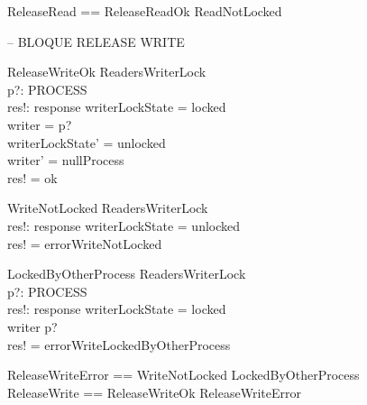 \documentclass{article}
\begin{document}
\begin{zed}
ReleaseRead == ReleaseReadOk \lor ReadNotLocked
\end{zed}

– BLOQUE RELEASE WRITE

\begin{schema}{ReleaseWriteOk}
    \Delta ReadersWriterLock \\
    p?: PROCESS \\
    res!: response
\where
    writerLockState = locked \\
    writer = p? \\
    writerLockState' = unlocked \\
    writer' = nullProcess \\
    res! = ok
\end{schema}

\begin{schema}{WriteNotLocked}
    \Xi ReadersWriterLock \\
    res!: response
\where
    writerLockState = unlocked \\
    res! = errorWriteNotLocked
\end{schema}

\begin{schema}{LockedByOtherProcess}
    \Xi ReadersWriterLock \\
    p?: PROCESS \\
    res!: response
\where
    writerLockState = locked \\
    writer \neq p? \\
    res! = errorWriteLockedByOtherProcess
\end{schema}

\begin{zed}
ReleaseWriteError == WriteNotLocked \lor LockedByOtherProcess \\
ReleaseWrite == ReleaseWriteOk \lor ReleaseWriteError
\end{zed}
\end{document}
